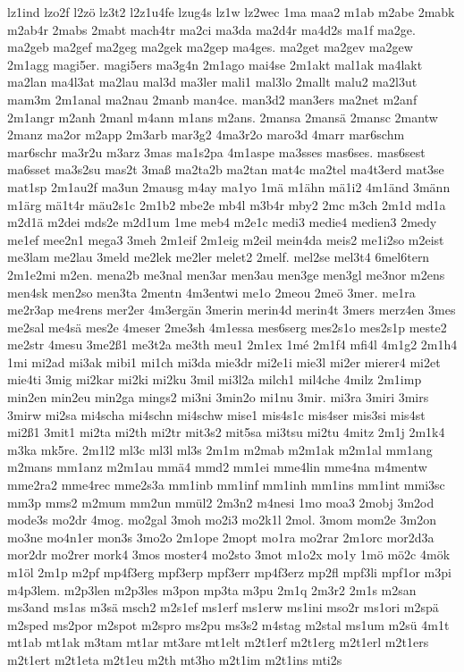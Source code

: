 {lz1ind
lzo2f
l2zö
lz3t2
l2z1u4fe
lzug4s
lz1w
lz2wec
1ma
maa2
m1ab
m2abe
2mabk
m2ab4r
2mabs
2mabt
mach4tr
ma2ci
ma3da
ma2d4r
ma4d2s
ma1f
ma2ge.
ma2geb
ma2gef
ma2geg
ma2gek
ma2gep
ma4ges.
ma2get
ma2gev
ma2gew
2m1agg
magi5er.
magi5ers
ma3g4n
2m1ago
mai4se
2m1akt
mal1ak
ma4lakt
ma2lan
ma4l3at
ma2lau
mal3d
ma3ler
mali1
mal3lo
2mallt
malu2
ma2l3ut
mam3m
2m1anal
ma2nau
2manb
man4ce.
man3d2
man3ers
ma2net
m2anf
2m1angr
m2anh
2manl
m4ann
m1ans
m2ans.
2mansa
2mansä
2mansc
2mantw
2manz
ma2or
m2app
2m3arb
mar3g2
4ma3r2o
maro3d
4marr
mar6schm
mar6schr
ma3r2u
m3arz
3mas
ma1s2pa
4m1aspe
ma3sses
mas6ses.
mas6sest
ma6sset
ma3s2su
mas2t
3maß
ma2ta2b
ma2tan
mat4c
ma2tel
ma4t3erd
mat3se
mat1sp
2m1au2f
ma3un
2mausg
m4ay
ma1yo
1mä
m1ähn
mä1i2
4m1änd
3männ
m1ärg
mä1t4r
mäu2s1c
2m1b2
mbe2e
mb4l
m3b4r
mby2
2mc
m3ch
2m1d
md1a
m2d1ä
m2dei
mds2e
m2d1um
1me
meb4
m2e1c
medi3
medie4
medien3
2medy
me1ef
mee2n1
mega3
3meh
2m1eif
2m1eig
m2eil
mein4da
meis2
me1i2so
m2eist
me3lam
me2lau
3meld
me2lek
me2ler
melet2
2melf.
mel2se
mel3t4
6mel6tern
2m1e2mi
m2en.
mena2b
me3nal
men3ar
men3au
men3ge
men3gl
me3nor
m2ens
men4sk
men2so
men3ta
2mentn
4m3entwi
me1o
2meou
2meö
3mer.
me1ra
me2r3ap
me4rens
mer2er
4m3ergän
3merin
merin4d
merin4t
3mers
merz4en
3mes
me2sal
me4sä
mes2e
4meser
2me3sh
4m1essa
mes6serg
mes2s1o
mes2s1p
meste2
me2str
4mesu
3me2ß1
me3t2a
me3th
meu1
2m1ex
1mé
2m1f4
mfi4l
4m1g2
2m1h4
1mi
mi2ad
mi3ak
mibi1
mi1ch
mi3da
mie3dr
mi2e1i
mie3l
mi2er
mierer4
mi2et
mie4ti
3mig
mi2kar
mi2ki
mi2ku
3mil
mi3l2a
milch1
mil4che
4milz
2m1imp
min2en
min2eu
min2ga
mings2
mi3ni
3min2o
mi1nu
3mir.
mi3ra
3miri
3mirs
3mirw
mi2sa
mi4scha
mi4schn
mi4schw
mise1
mis4s1c
mis4ser
mis3si
mis4st
mi2ß1
3mit1
mi2ta
mi2th
mi2tr
mit3s2
mit5sa
mi3tsu
mi2tu
4mitz
2m1j
2m1k4
m3ka
mk5re.
2m1l2
ml3c
ml3l
ml3s
2m1m
m2mab
m2m1ak
m2m1al
mm1ang
m2mans
mm1anz
m2m1au
mmä4
mmd2
mm1ei
mme4lin
mme4na
m4mentw
mme2ra2
mme4rec
mme2s3a
mm1inb
mm1inf
mm1inh
mm1ins
mm1int
mmi3sc
mm3p
mms2
m2mum
mm2un
mmül2
2m3n2
m4nesi
1mo
moa3
2mobj
3m2od
mode3s
mo2dr
4mog.
mo2gal
3moh
mo2i3
mo2k1l
2mol.
3mom
mom2e
3m2on
mo3ne
mo4n1er
mon3s
3mo2o
2m1ope
2mopt
mo1ra
mo2rar
2m1orc
mor2d3a
mor2dr
mo2rer
mork4
3mos
moster4
mo2sto
3mot
m1o2x
mo1y
1mö
mö2c
4mök
m1öl
2m1p
m2pf
mp4f3erg
mpf3erp
mpf3err
mp4f3erz
mp2fl
mpf3li
mpf1or
m3pi
m4p3lem.
m2p3len
m2p3les
m3pon
mp3ta
m3pu
2m1q
2m3r2
2m1s
m2san
ms3and
ms1as
m3sä
msch2
m2s1ef
ms1erf
ms1erw
ms1ini
mso2r
ms1ori
m2spä
m2sped
ms2por
m2spot
m2spro
ms2pu
ms3s2
m4stag
m2stal
ms1um
m2sü
4m1t
mt1ab
mt1ak
m3tam
mt1ar
mt3are
mt1elt
m2t1erf
m2t1erg
m2t1erl
m2t1ers
m2t1ert
m2t1eta
m2t1eu
m2th
mt3ho
m2t1im
m2t1ins
mti2s
}
